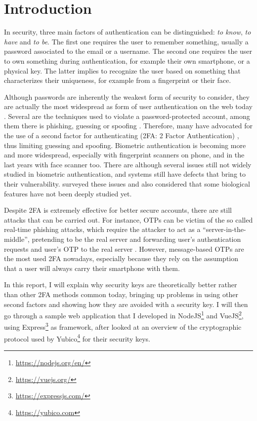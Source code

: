 \section{Introduction}\label{introduction}
In security, three main factors of authentication can be distinguished: \emph{to know}, \emph{to have} and \emph{to be}. The first one requires the user to remember something, usually a password associated to the email or a username. The second one requires the user to own something during authentication, for example their own smartphone, or a physical key. The latter implies to recognize the user based on something that characterizes their uniqueness, for example from a fingerprint or their face.

Although passwords are inherently the weakest form of security to consider, they are actually the most widespread as form of user authentication on the web today \cite{reynolds2018tale}. Several are the techniques used to violate a password-protected account, among them there is phishing, guessing or spoofing \cite{reynolds2018tale}. Therefore, many have advocated for the use of a second factor for authenticating (2FA: 2 Factor Authentication) \cite{bonneau2012quest}, thus limiting guessing and spoofing. Biometric authentication is becoming more and more widespread, especially with fingerprint scanners on phone, and in the last years with face scanner too. There are although several issues still not widely studied in biometric authentication, and systems still have defects that bring to their vulnerability. \citet{bonneau2012quest} surveyed these issues and also considered that some biological features have not been deeply studied yet.

Despite 2FA is extremely effective for better secure accounts, there are still attacks that can be carried out. For instance, OTPs can be victim of the so called real-time phishing attacks, which require the attacker to act as a ``server-in-the-middle'', pretending to be the real server and forwarding user's authentication requests and user's OTP to the real server \cite{reailton2015phishing}. However, message-based OTPs are the most used 2FA nowadays, especially because they rely on the assumption that a user will always carry their smartphone with them.

In this report, I will explain why security keys are theoretically better rather than other 2FA methods common today, bringing up problems in using other second factors and showing how they are avoided with a security key. I will then go through a sample web application that I developed in NodeJS\footnote{\url{https://nodejs.org/en/}} and VueJS\footnote{\url{https://vuejs.org/}}, using Express\footnote{\url{https://expressjs.com/}} as framework, after looked at an overview of the cryptographic protocol used by Yubico\footnote{\url{https://yubico.com}} for their security keys.